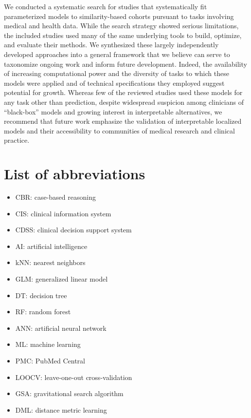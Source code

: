 \documentclass[sn-mathphys,Numbered,pdflatex]{sn-jnl}
\theoremstyle{remark}
\theoremstyle{definition}
\newcommand{\hl}[1]{#1}
\providecommand{\tightlist}{%
  \setlength{\itemsep}{0pt}\setlength{\parskip}{0pt}}
\begin{document}
We conducted a systematic search for studies that
\hl{systematically fit parameterized models to similarity-based cohorts pursuant}
to tasks involving \hl{medical and }health data\hl{. }While the search
\hl{strategy showed serious limitations}, the included studies used many
of the same underlying tools to build, optimize, and evaluate their
methods.
\hl{We synthesized these largely independently developed approaches into a general framework that we believe}
can serve to taxonomize ongoing \hl{work }and inform
\hl{future development}. Indeed, the availability of increasing
computational power\hl{ and} the diversity of tasks to which these
models were applied and of technical specifications they
\hl{employed suggest }potential for growth. \hl{Whereas} few of the
reviewed studies used these models for any task other than prediction,
despite widespread suspicion among clinicians of ``black-box'' models
and growing interest in interpretable alternatives, we recommend that
future work \hl{emphasize the} validation of interpretable localized
models \hl{and their accessibility to} communities of medical research
and clinical practice.

\section*{List of abbreviations}\label{list-of-abbreviations}

\begin{itemize}
\tightlist
\item
  CBR: case-based reasoning
\item
  CIS: clinical information system
\item
  \hl{CDSS:} clinical decision support\hl{ system}
\item
  AI: artificial intelligence
\item
  \hl{kNN}: nearest neighbors
\item
  GLM: generalized linear model
\item
  \hl{DT: decision tree}
\item
  \hl{RF: random forest}
\item
  \hl{ANN: artificial neural network}
\item
  ML: machine learning
\item
  PMC: PubMed Central
\item
  LOOCV: leave-one-out cross-validation
\item
  GSA: gravitational search algorithm
\item
  DML: distance metric learning
\end{itemize}
\end{document}
